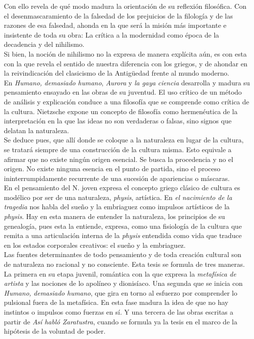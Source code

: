 \documentclass[a4paper, 10pt, twocolumn, spanish]{article}
\begin{document}
Con ello revela de qué modo madura la orientación de su reflexión
filosófica. Con el desenmascaramiento de la falsedad de los prejuicios
de la filología y de las razones de esa falsedad, ahonda en la que
será la misión más importante e insistente de toda su obra: La crítica
a la modernidad como época de la decadencia y del nihilismo.\\[0pt]
Si bien, la noción de nihilismo no la expresa de manera explícita aún,
es con esta con la que revela el sentido de nuestra diferencia con los
griegos, y de ahondar en la reivindicación del clasicismo de la
Antigüedad frente al mundo moderno.\\[0pt]


En \emph{Humano, demasiado humano}, \emph{Aurora} y \emph{la gaya ciencia} desarrolla
y madura su pensamiento ensayado en las obras de su juventud. El uso
crítico de un método de análisis y explicación conduce a una filosofía
que se comprende como crítica de la cultura. Nietzsche expone un
concepto de filosofía como hermenéutica de la interpretación en la que
las ideas no son verdaderas o falsas, sino signos que delatan la
naturaleza.\\[0pt]
Se deduce pues, que allí donde se coloque a la naturaleza en lugar de
la cultura, se tratará siempre de una construcción de la cultura
misma. Esto equivale a afirmar que no existe ningún origen
esencial. Se busca la procedencia y no el origen. No existe ninguna
esencia en el punto de partida, sino el proceso ininterrumpidamente
recurrente de una sucesión de apariencias o máscaras.\\[0pt]

En el pensamiento del N. joven expresa el concepto griego clásico de
cultura es modélico por ser de una naturaleza, \emph{physis}, artística. En
\emph{el nacimiento de la tragedia} nos habla del sueño y la embriaguez
como impulsos artísticos de la \emph{physis}. Hay en esta manera de
entender la naturaleza, los principios de su genealogía, pues esta la
entiende, expresa, como una fisiología de la cultura que remita a una
articulación interna de la \emph{physis} entendida como vida que traduce en
los estados corporales creativos: el sueño y la embriaguez.\\[0pt]

Las fuentes determinantes de todo pensamiento y de toda creación
cultural son de naturaleza no racional y no consciente. Esta tesis se
formula de tres maneras. La primera en su etapa juvenil, romántica con
la que expresa la \emph{metafísica de artista} y las nociones de lo
apolíneo y dionisíaco. Una segunda que se inicia con \emph{Humano,}
\emph{demasiado humano}, que gira en torno al esfuerzo por comprender lo
pulsional fuera de la metafísica. En esta fase madura la idea de que
no hay instintos o impulsos como fuerzas en sí. Y una tercera de las
obras escritas a partir de \emph{Así habló Zaratustra}, cuando se formula
ya la tesis en el marco de la hipótesis de la voluntad de poder.\\[0pt]
\end{document}
